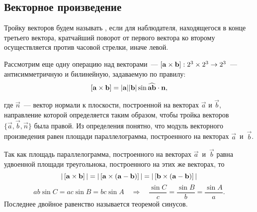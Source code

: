 \subsection{Векторное произведение}
\label{sec:cross-product}

Тройку векторов будем называть , если для наблюдателя, находящегося в конце третьего вектора, кратчайший поворот от первого вектора ко второму осуществляется против часовой стрелки, иначе левой.

Рассмотрим еще одну операцию над векторами~---  $\left[\mathbf{a} \times \mathbf{b}\right]: 2^3 \times 2^3 \rightarrow 2^3$~--- антисимметричную и билинейную, задаваемую по правилу:
\begin{equation}
    \left[\mathbf{a} \times \mathbf{b}\right] = |\mathbf{a}||\mathbf{b}| \sin \widehat{\mathbf{a}\mathbf{b}} \cdot \mathbf{n},
\end{equation}
\begin{wrapfigure}{r}{0.25\tw}
    \centering
    \vspace{.1pc}
    \caption{}
    \vspace{-1pc}
    \label{pic:math-cross}
\end{wrapfigure}
где $\vec{n}$~--- вектор нормали к плоскости, построенной на векторах $\vec{a}$ и $\vec{b}$, направление которой определяется таким образом, чтобы тройка векторов $\{\vec{a}, \vec{b}, \vec{n} \}$ была правой. Из определения понятно, что модуль векторного произведения равен площади параллелограмма, построенного на векторах $\vec{a}$~и~$\vec{b}$.

Так как площадь параллелограмма, построенного на векторах $\vec{a}$~и~$\vec{b}$ равна удвоенной площади треугольнока, построенного на этих же векторах, то
\begin{equation}
    |\left[\mathbf{a} \times \mathbf{b}\right]| = |\left[\mathbf{a} \times \mathbf{(a - b)}\right] | = |\left[\mathbf{b} \times \mathbf{(a-b)}\right]|
\end{equation}
\begin{equation}
    a b \sin C = a c \sin B = b c \sin A \quad \Rightarrow \quad \frac{\sin C}{c} = \frac{\sin B}{b} = \frac{\sin A}{a}.
\end{equation}
Последнее двойное равенство называется теоремой синусов.

